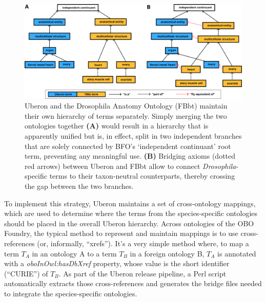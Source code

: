\documentclass{ceurart}
\def\species#1{\textit{#1}}
\def\term#1{`#1'}
\def\property#1{\textit{#1}}
\begin{document}
\begin{figure}
  \centering
  \includegraphics[width=\linewidth]{bridges}
  \caption{Uberon and the Drosophila Anatomy Ontology (FBbt) maintain
  their own hierarchy of terms separately. Simply merging the two
  ontologies together \textbf{(A)} would result in a hierarchy that is
  apparently unified but is, in effect, split in two independent
  branches that are solely connected by BFO's \term{independent
  continuant} root term, preventing any meaningful use. \textbf{(B)}
  Bridging axioms (dotted red arrows) between Uberon and FBbt allow to
  connect \species{Drosophila}-specific terms to their taxon-neutral
  counterparts, thereby crossing the gap between the two branches.}
  \label{fig:bridges}
\end{figure}

To implement this strategy, Uberon maintains a set of cross-ontology
mappings, which are used to determine where the terms from the
species-specific ontologies should be placed in the overall Uberon
hierarchy. Across ontologies of the OBO Foundry, the typical method to
represent and maintain mappings is to use cross-references (or,
informally, ``xrefs''). It’s a very simple method where, to map a term
$T_A$ in an ontology A to a term $T_B$ in a foreign ontology B, $T_A$ is
annotated with a \property{oboInOwl:hasDbXref} property, whose value is
the short identifier (``CURIE'') of $T_B$. As part of the Uberon release
pipeline, a Perl script automatically extracts those cross-references
and generates the bridge files needed to integrate the species-specific
ontologies.
\end{document}
